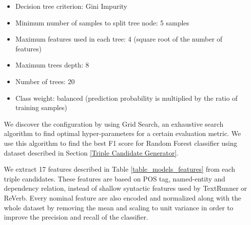 \documentclass[conference,compsoc,12pt]{IEEEtran}
\begin{document}
\begin{itemize}
\item Decision tree criterion: Gini Impurity
\item Minimum number of samples to split tree node: 5 samples
\item Maximum features used in each tree: 4 (square root of the number of features)
\item Maximum trees depth: 8
\item Number of trees: 20
\item Class weight: balanced (prediction probability is multiplied by the ratio of training samples)
\end{itemize}

We discover the configuration by using Grid Search\cite{wasserman2015grid}, an exhaustive search algorithm to find optimal hyper-parameters for a certain evaluation metric. We use this algorithm to find the best F1 score for Random Forest classifier using dataset described in Section \ref{Triple Candidate Generator}. 

We extract 17 features described in Table \ref{table_models_features} from each triple candidates. These features are based on POS tag, named-entity and dependency relation, instead of shallow syntactic features used by TextRunner or ReVerb\cite{banko2007open}\cite{etzioni2011open}. Every nominal feature are also encoded and normalized along with the whole dataset by removing the mean and scaling to unit variance in order to improve the precision and recall of the classifier.
\end{document}
